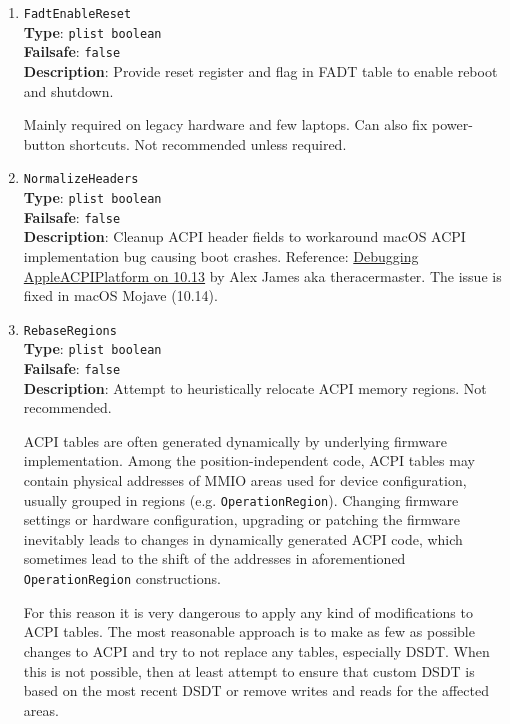 \documentclass[]{article}
\begin{document}
\begin{enumerate}

\item
  \texttt{FadtEnableReset}\\
  \textbf{Type}: \texttt{plist\ boolean}\\
  \textbf{Failsafe}: \texttt{false}\\
  \textbf{Description}: Provide reset register and flag in FADT table to enable
  reboot and shutdown.

  Mainly required on legacy hardware and few laptops. Can also fix power-button
  shortcuts. Not recommended unless required.

\item
  \texttt{NormalizeHeaders}\\
  \textbf{Type}: \texttt{plist\ boolean}\\
  \textbf{Failsafe}: \texttt{false}\\
  \textbf{Description}: Cleanup ACPI header fields to workaround macOS
  ACPI implementation bug causing boot crashes. Reference:
  \href{https://alextjam.es/debugging-appleacpiplatform/}{Debugging
  AppleACPIPlatform on 10.13} by Alex James aka theracermaster. The
  issue is fixed in macOS Mojave (10.14).

\item
  \texttt{RebaseRegions}\\
  \textbf{Type}: \texttt{plist\ boolean}\\
  \textbf{Failsafe}: \texttt{false}\\
  \textbf{Description}: Attempt to heuristically relocate ACPI memory
  regions. Not recommended.

  ACPI tables are often generated dynamically by underlying firmware
  implementation. Among the position-independent code, ACPI tables may
  contain physical addresses of MMIO areas used for device
  configuration, usually grouped in regions (e.g.
  \texttt{OperationRegion}). Changing firmware settings or hardware
  configuration, upgrading or patching the firmware inevitably leads to
  changes in dynamically generated ACPI code, which sometimes lead to
  the shift of the addresses in aforementioned \texttt{OperationRegion}
  constructions.

  For this reason it is very dangerous to apply any kind of
  modifications to ACPI tables. The most reasonable approach is to make
  as few as possible changes to ACPI and try to not replace any tables,
  especially DSDT. When this is not possible, then at least attempt to
  ensure that custom DSDT is based on the most recent DSDT or remove
  writes and reads for the affected areas.


\end{enumerate}
\end{document}
